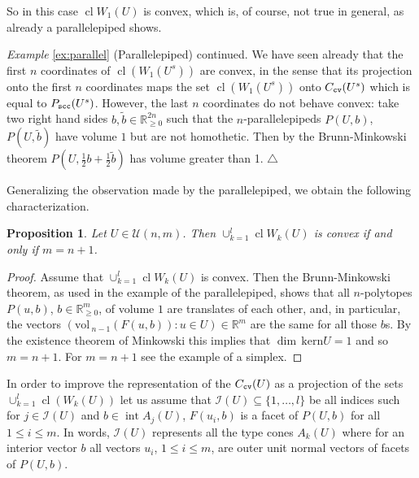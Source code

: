 \documentclass[11pt, a4paper, twoside, reqno]{amsart}
\DeclareMathOperator*{\cl}{cl}
\DeclareMathOperator*{\inter}{int}
\newcommand{\R}{\mathbb{R}}
\newtheorem{proposition}[theorem]{Proposition}
\theoremstyle{definition}
\theoremstyle{remark}
\newcommand{\vol}{\mathrm{vol}\,}
\newcommand{\scc}{{\tt scc}}
\newcommand{\cv}{{\tt cv}}
\numberwithin{equation}{section}
\begin{document}
So in this case $\cl W_1(U)$ is convex, which is, of course, not true in general, as already a parallelepiped shows.

\medskip\noindent
{\it Example} \ref{ex:parallel} (Parallelepiped) {continued}. We
have seen already that the first $n$ coordinates of $\cl(W_1(U^s))$ are convex,
in the sense that its projection onto the first $n$ coordinates maps the set $\cl(W_1(U^s))$ onto $C_{\cv}(U^s)$ which is equal to $P_\scc(U^s)$. However, the last $n$ coordinates do not behave convex: take two right hand sides $b,\tilde{b}\in\R^{2n}_{\geq 0}$ such that the $n$-parallelepipeds $P(U,b)$, $P(U,\tilde{b})$ have volume $1$ but are not homothetic. Then by the Brunn-Minkowski theorem $P(U, \frac{1}{2}b+\frac{1}{2}\tilde{b})$ has volume greater than 1.
\hfill $\triangle$

Generalizing the observation made by the parallelepiped, we obtain the following characterization.

\begin{proposition} Let $U\in\mathcal{U}(n,m)$. Then $\cup_{k=1}^l \cl W_k(U)$ is convex if and only if $m=n+1$.
\end{proposition}
\begin{proof} Assume that $\cup_{k=1}^l \cl W_k(U)$ is convex. Then the Brunn-Minkowski theorem, as used in the example of the parallelepiped, shows that all $n$-polytopes $P(u,b)$, $b\in\R^m_{\geq 0}$, of volume $1$ are translates of each other, and, in particular,  the vectors $(\vol_{n-1}( F(u,b)) : u\in U) \in\R^m$ are the same for all those $b$s. By the existence theorem of Minkowski this implies that $\dim\, \mathrm{kern} U =1$ and so $m=n+1$.   For $m=n+1$  see the example of a simplex.
\end{proof}





In order to improve the representation of the $C_\cv(U)$  as a projection of the sets $\cup_{k=1}^l\cl(W_k(U))$
let us assume that $\mathcal{I}(U)\subseteq\{1,\dots,l\}$ be all indices such for $j\in   \mathcal{I}(U)$
and $b\in\inter A_j(U)$,  $F(u_i,b)$ is a facet of $P(U,b)$ for all $1\leq i\leq m$. In words, $\mathcal{I}(U)$ represents all the type cones $A_k(U)$ where for an interior vector $b$ all vectors $u_i$, $1\leq i\leq m$, are outer unit normal vectors of  facets of $P(U,b)$.
\end{document}
